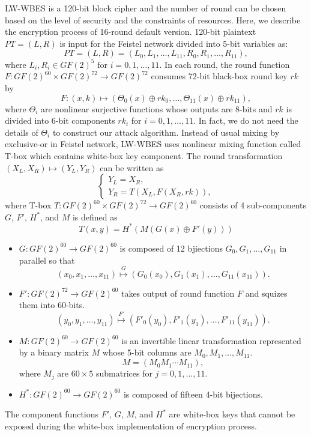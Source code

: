 \documentclass{ieeeaccess}
\begin{document}
LW-WBES is a 120-bit block cipher and the number of round
can be chosen based on the level of security and the constraints of resources.
Here, we describe the encryption process of 16-round default version.
120-bit plaintext $PT=(L,R)$ is input  for the Feistel network divided into
5-bit variables as:
\[
PT = (L,R) = (L_0, L_1, \ldots, L_{11}, R_0, R_1, \ldots, R_{11}),
\]
where 
$L_i, R_i \in GF(2)^5 \text{ for } i=0,1, \ldots, 11$.
In each round, the round function $F: GF(2)^{60}\times GF(2)^{72} \to GF(2)^{72}$
consumes 72-bit black-box round key $rk$ by
\[
F: (x,k) \mapsto (\Theta_0(x)\oplus rk_0, \ldots, \Theta_{11}(x)\oplus rk_{11}),
\]
where $\Theta_i$ are nonlinear surjective functions whose outputs are 8-bits 
and $rk$ is divided into 6-bit components $rk_i$ for $i=0,1,\ldots, 11$.
In fact, we do not need the details of $\Theta_i$ to construct our attack algorithm.
Instead of usual mixing by exclusive-or in Feistel network,
LW-WBES uses nonlinear mixing function called T-box which contains
white-box key component.
The round transformation $(X_L, X_R) \mapsto (Y_L, Y_R)$ can be written as
\[
\begin{cases}
Y_L = X_R, \\
Y_R = T(X_L, F(X_R,rk)),
\end{cases}
\]
where T-box $T: GF(2)^{60} \times GF(2)^{72} \to GF(2)^{60}$  consists of
4 sub-components $G$, $F'$, $H^*$, and $M$ is defined as
\[
T(x,y) = H^*(M(G(x)\oplus F'(y)))
\]
\begin{itemize}
\item $G: GF(2)^{60} \to GF(2)^{60}$ is composed of 12 bjiections
$G_0, G_1, \ldots, G_{11}$ in parallel so that
\[
(x_0, x_1, \ldots, x_{11}) \stackrel{G}{\mapsto} (G_0(x_0), G_1(x_1),\ldots, G_{11}(x_{11})).
\]
\item $F': GF(2)^{72} \to GF(2)^{60}$ takes output of round function $F$ and
squizes them into 60-bits.
\[
(y_0, y_1, \ldots, y_{11}) \stackrel{F'}{\mapsto} (F'_0(y_0), F'_1(y_1),\ldots, F'_{11}(y_{11})).
\]
\item $M: GF(2)^{60} \to GF(2)^{60}$ is an invertible linear transformation represented
by a binary matrix $M$ whose 5-bit columns are $M_0, M_1, \ldots, M_{11}$.
\[
M = \left( M_0 M_1 \cdots M_{11} \right), 
\]
where $M_j$ are $60\times 5$ submatrices for $j=0,1,\ldots, 11$.
\item $H^*: GF(2)^{60} \to GF(2)^{60}$ is composed of fifteen 4-bit bijections.
\end{itemize}
The component functions $F'$, $G$, $M$, and $H^*$ are
white-box keys that cannot be exposed during the white-box implementation of encryption process.
\end{document}

